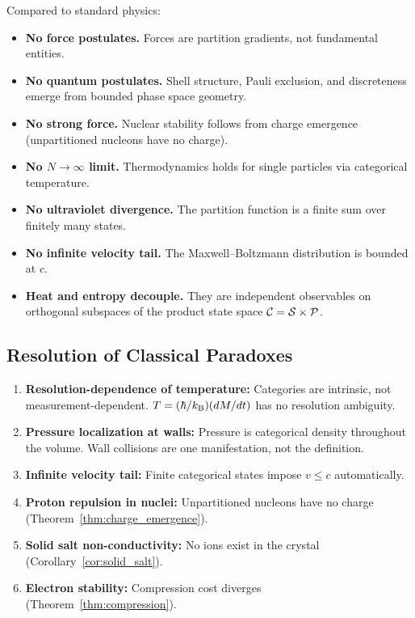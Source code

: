 Compared to standard physics:
\begin{itemize}
    \item \textbf{No force postulates.} Forces are partition gradients, not fundamental entities.
    \item \textbf{No quantum postulates.} Shell structure, Pauli exclusion, and discreteness emerge from bounded phase space geometry.
    \item \textbf{No strong force.} Nuclear stability follows from charge emergence (unpartitioned nucleons have no charge).
    \item \textbf{No $N \to \infty$ limit.} Thermodynamics holds for single particles via categorical temperature.
    \item \textbf{No ultraviolet divergence.} The partition function is a finite sum over finitely many states.
    \item \textbf{No infinite velocity tail.} The Maxwell--Boltzmann distribution is bounded at $c$.
    \item \textbf{Heat and entropy decouple.} They are independent observables on orthogonal subspaces of the product state space $\mathcal{C} = \mathcal{S} \times \mathcal{P}$.
\end{itemize}

\subsection{Resolution of Classical Paradoxes}

\begin{enumerate}
    \item \textbf{Resolution-dependence of temperature:} Categories are intrinsic, not measurement-dependent. $T = (\hbar/k_{\mathrm{B}})(dM/dt)$ has no resolution ambiguity.
    \item \textbf{Pressure localization at walls:} Pressure is categorical density throughout the volume. Wall collisions are one manifestation, not the definition.
    \item \textbf{Infinite velocity tail:} Finite categorical states impose $v \leq c$ automatically.
    \item \textbf{Proton repulsion in nuclei:} Unpartitioned nucleons have no charge (Theorem~\ref{thm:charge_emergence}).
    \item \textbf{Solid salt non-conductivity:} No ions exist in the crystal (Corollary~\ref{cor:solid_salt}).
    \item \textbf{Electron stability:} Compression cost diverges (Theorem~\ref{thm:compression}).
\end{enumerate}


